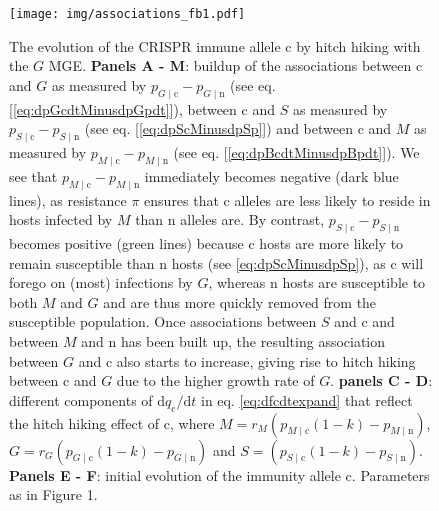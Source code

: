 \documentclass{article}
\newcommand{\badFGE}{M}
\newcommand{\goodFGE}{G}
\newcommand{\sensitive}{\mathrm{n}}
\newcommand{\immune}{\mathrm{c}}
\begin{document}
\begin{figure}
\internallinenumbers
\hypertarget{fig:associations}{%
\centering
\texttt{[image: img/associations\_fb1.pdf]}
\caption{The evolution of the CRISPR immune allele $\immune$ by hitch hiking with the $\goodFGE$ MGE. \textbf{Panels A - \badFGE}: buildup of the associations between $\immune$ and $\goodFGE$ as measured by $p_{\goodFGE \mid \immune} - p_{\goodFGE \mid \sensitive}$ (see eq. [\ref{eq:dpGcdtMinusdpGpdt}]), between $\immune$ and $S$ as measured by $p_{S \mid \immune} - p_{S \mid \sensitive}$ (see eq. [\ref{eq:dpScMinusdpSp}]) and between $\immune$ and $\badFGE$ as measured by $p_{\badFGE \mid \immune} - p_{\badFGE \mid \sensitive}$ (see eq. [\ref{eq:dpBcdtMinusdpBpdt}]). We see that $p_{\badFGE \mid \immune} - p_{\badFGE \mid \sensitive}$ immediately becomes negative (dark blue lines), as resistance $\pi$ ensures that $\immune$ alleles are less likely to reside in hosts infected by $\badFGE$ than $\sensitive$ alleles are. By contrast, $p_{S \mid \immune} - p_{S \mid \sensitive}$ becomes positive (green lines) because $\immune$ hosts are more likely to remain susceptible than $\sensitive$ hosts (see \ref{eq:dpScMinusdpSp}), as $\immune$ will forego on (most) infections by $\goodFGE$, whereas $\sensitive$ hosts are susceptible to both $\badFGE$ and $\goodFGE$ and are thus more quickly removed from the susceptible population. Once associations between $S$ and $\immune$ and between $\badFGE$ and $\sensitive$ has been built up, the resulting association between $\goodFGE$ and $\immune$ also starts to increase, giving rise to hitch hiking between $\immune$ and $\goodFGE$ due to the higher growth rate of $\goodFGE$. \textbf{panels C - D}: different components of $\mathrm{d}q_{\immune} / \mathrm{d}t$ in eq. \eqref{eq:dfcdtexpand} that reflect the hitch hiking effect of $\immune$, where $\badFGE = r_{\badFGE} \left ( p_{\badFGE \mid \immune}(1-k) - p_{\badFGE \mid \sensitive} \right )$, $\goodFGE = r_{\goodFGE} \left ( p_{\goodFGE \mid \immune}(1-k) - p_{\goodFGE \mid \sensitive} \right )$ and $S = \left( p_{S \mid \immune}(1-k) - p_{S \mid \sensitive} \right )$. \textbf{Panels E - F}: initial evolution of the immunity allele $\immune$. Parameters as in Figure 1.}
\label{fig:associations} 
}
\end{figure}
\end{document}
